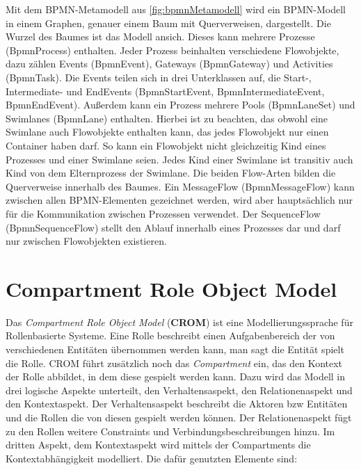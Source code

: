 Mit dem BPMN-Metamodell aus \cref{fig:bpmnMetamodell} wird ein BPMN-Modell in einem Graphen, genauer einem Baum mit Querverweisen, dargestellt.
Die Wurzel des Baumes ist das Modell ansich.
Dieses kann mehrere Prozesse (BpmnProcess) enthalten.
Jeder Prozess beinhalten verschiedene Flowobjekte, dazu zählen Events (BpmnEvent), Gateways (BpmnGateway) und Activities (BpmnTask).
Die Events teilen sich in drei Unterklassen auf, die Start-, Intermediate- und EndEvents (BpmnStartEvent, BpmnIntermediateEvent, BpmnEndEvent).
Außerdem kann ein Prozess mehrere Pools (BpmnLaneSet) und Swimlanes (BpmnLane) enthalten.
Hierbei ist zu beachten, das obwohl eine Swimlane auch Flowobjekte enthalten kann, das jedes Flowobjekt nur einen Container haben darf.
So kann ein Flowobjekt nicht gleichzeitig Kind eines Prozesses und einer Swimlane seien.
Jedes Kind einer Swimlane ist transitiv auch Kind von dem Elternprozess der Swimlane.
Die beiden Flow-Arten bilden die Querverweise innerhalb des Baumes.
Ein MessageFlow (BpmnMessageFlow) kann zwischen allen BPMN-Elementen gezeichnet werden, wird aber hauptsächlich nur für die Kommunikation zwischen Prozessen verwendet.
Der SequenceFlow (BpmnSequenceFlow) stellt den Ablauf innerhalb eines Prozesses dar und darf nur zwischen Flowobjekten existieren.

\section{Compartment Role Object Model}

Das \emph{Compartment Role Object Model} (\textbf{CROM}) ist eine Modellierungssprache für Rollenbasierte Systeme.
Eine Rolle beschreibt einen Aufgabenbereich der von verschiedenen Entitäten übernommen werden kann, man sagt die Entität spielt die Rolle.
CROM führt zusätzlich noch das \emph{Compartment} ein, das den Kontext der Rolle abbildet, in dem diese gespielt werden kann.
Dazu wird das Modell in drei logische Aspekte unterteilt, den Verhaltensaspekt, den Relationenaspekt und den Kontextaspekt.
Der Verhaltensaspekt beschreibt die Aktoren bzw Entitäten und die Rollen die von diesen gespielt werden können.
Der Relationenaspekt fügt zu den Rollen weitere Constraints und Verbindungsbeschreibungen hinzu.
Im dritten Aspekt, dem Kontextaspekt wird mittels der Compartments die Kontextabhängigkeit modelliert.
Die dafür genutzten Elemente sind:

